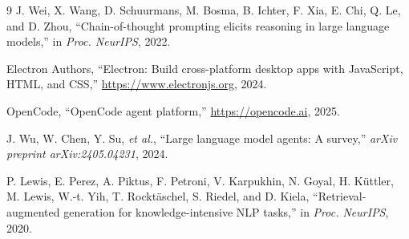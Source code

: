 \documentclass[conference]{IEEEtran}
\begin{document}
\begin{thebibliography}{9}
 J. Wei, X. Wang, D. Schuurmans, M. Bosma,
B. Ichter, F. Xia, E. Chi, Q. Le, and D. Zhou, ``Chain-of-thought
prompting elicits reasoning in large language models,'' in
\emph{Proc. NeurIPS}, 2022.

 Electron Authors, ``Electron: Build cross-platform
desktop apps with JavaScript, HTML, and CSS,''
\url{https://www.electronjs.org}, 2024.

 OpenCode, ``OpenCode agent platform,''
\url{https://opencode.ai}, 2025.

 J. Wu, W. Chen, Y. Su, \emph{et al.},
``Large language model agents: A survey,'' \emph{arXiv preprint
arXiv:2405.04231}, 2024.

 P. Lewis, E. Perez, A. Piktus, F. Petroni,
V. Karpukhin, N. Goyal, H. K\"{u}ttler, M. Lewis, W.-t. Yih,
T. Rockt\"{a}schel, S. Riedel, and D. Kiela, ``Retrieval-augmented
generation for knowledge-intensive NLP tasks,'' in \emph{Proc.
NeurIPS}, 2020.

\end{thebibliography}
\end{document}
